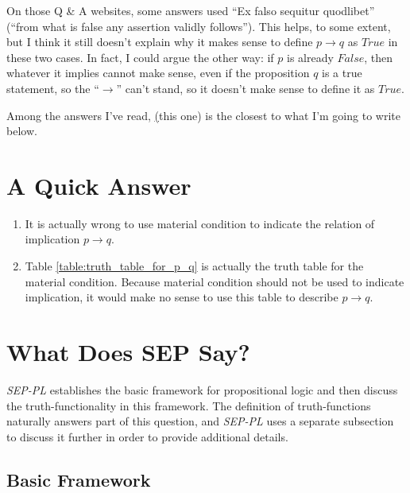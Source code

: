 \documentclass[12pt, letterpaper]{article}
\begin{document}
On those Q \& A websites, some answers used ``Ex falso sequitur quodlibet''
(``from what is false any assertion validly follows''). This helps, to some
extent, but I think it still doesn't explain why it makes sense to define $p
\rightarrow q$ as $True$ in these two cases. In fact, I could argue the other way:
if $p$ is already $False$, then whatever it implies cannot make sense, even if
the proposition $q$ is a true statement, so the ``$\rightarrow$'' can't stand,
so it doesn't make sense to define it as $True$.

Among the answers I've read, \href{https://math.stackexchange.com/a/70739/665777}(this one)
is the closest to what I'm going to write below.

\section{A Quick Answer}

\begin{enumerate}
  \item It is actually wrong to use material condition to indicate the relation
    of implication $p \rightarrow q$.
  \item Table \ref{table:truth_table_for_p_q} is actually the truth table for
    the material condition. Because material condition should not be used to
    indicate implication, it would make no sense to use this table to describe
    $p \rightarrow q$.
\end{enumerate}

\section{What Does SEP Say?}

\textit{SEP-PL} establishes the basic framework for propositional logic and
then discuss the truth-functionality in this framework. The definition of
truth-functions naturally answers part of this question, and \textit{SEP-PL}
uses a separate subsection to discuss it further in order to provide additional
details.

\subsection{Basic Framework}
\end{document}
